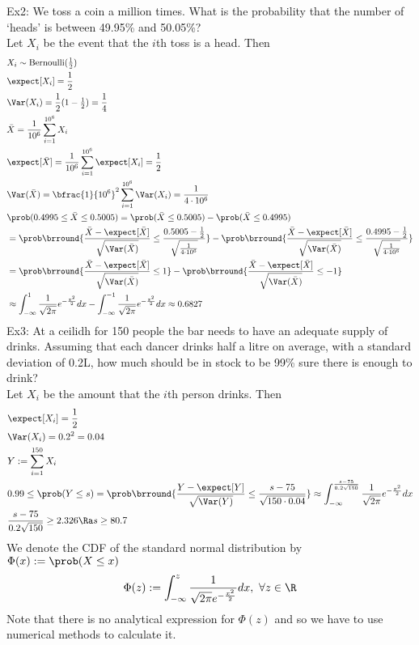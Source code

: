 Ex2: We toss a coin a million times. What is the probability that the number of `heads' is between 49.95\% and 50.05\%?\\
Let $X_i$ be the event that the $i$th toss is a head. Then
\begin{align*}
    &X_i\sim\mathrm{Bernoulli}(\tfrac{1}{2})\\
    &\expect[X_i]=\frac{1}{2}\\
    &\Var(X_i)=\frac{1}{2}(1-\tfrac{1}{2})=\frac{1}{4}\\
    &\bar{X}=\frac{1}{10^6}\sum_{i=1}^{10^6}X_i\\
    &\expect[\bar{X}]=\frac{1}{10^6}\sum_{i=1}^{10^6}\expect[X_i]=\frac{1}{2}\\
    &\Var(\bar{X})=\bfrac{1}{10^{6}}^2\sum_{i=1}^{10^6}\Var(X_i)=\frac{1}{4\cdot10^6}\\
    &\prob(0.4995\leq\bar{X}\leq0.5005)=\prob(\bar{X}\leq0.5005)-\prob(\bar{X}\leq0.4995)\\
    &=\prob\brround{\frac{\bar{X}-\expect[\bar{X}]}{\sqrt{\Var(\bar{X})}}\leq\frac{0.5005-\frac{1}{2}}{\sqrt{\frac{1}{4\cdot 10^6}}}}-\prob\brround{\frac{\bar{X}-\expect[\bar{X}]}{\sqrt{\Var(\bar{X})}}\leq\frac{0.4995-\frac{1}{2}}{\sqrt{\frac{1}{4\cdot 10^6}}}}\\
    &=\prob\brround{\frac{\bar{X}-\expect[\bar{X}]}{\sqrt{\Var(\bar{X})}}\leq1}-\prob\brround{\frac{\bar{X}-\expect[\bar{X}]}{\sqrt{\Var(\bar{X})}}\leq-1}\\
    &\approx\int_{-\infty}^1\frac{1}{\sqrt{2\pi}}e^{-\frac{x^2}{2}}dx-\int_{-\infty}^{-1}\frac{1}{\sqrt{2\pi}}e^{-\frac{x^2}{2}}dx\approx 0.6827
\end{align*}
Ex3: At a ceilidh for 150 people the bar needs to have an adequate supply of drinks. Assuming that each dancer drinks half a litre on average, with a standard deviation of 0.2L, how much should be in stock to be 99\% sure there is enough to drink?\\
Let $X_i$ be the amount that the $i$th person drinks. Then
\begin{align*}
    &\expect[X_i]=\frac{1}{2}\\
    &\Var(X_i)=0.2^2=0.04\\
    &Y:=\sum_{i=1}^{150}X_i\\
    &0.99\leq\prob(Y\leq s)=\prob\brround{\frac{Y-\expect[Y]}{\sqrt{\Var(Y)}}\leq\frac{s-75}{\sqrt{150\cdot0.04}}}\approx\int_{-\infty}^{\frac{s-75}{0.2\sqrt{150}}}\frac{1}{\sqrt{2\pi}}e^{-\frac{x^2}{2}}dx\\
    &\frac{s-75}{0.2\sqrt{150}}\geq 2.326\Ra s\geq 80.7
\end{align*}
We denote the CDF of the standard normal distribution by $\Phi(x):=\prob(X\leq x)$
\[\Phi(z):=\int_{-\infty}^z\frac{1}{\sqrt{2\pi}e^{-\frac{x^2}{2}}}dx,\ \forall z\in\R\]
Note that there is no analytical expression for $\Phi(z)$ and so we have to use numerical methods to calculate it.\\